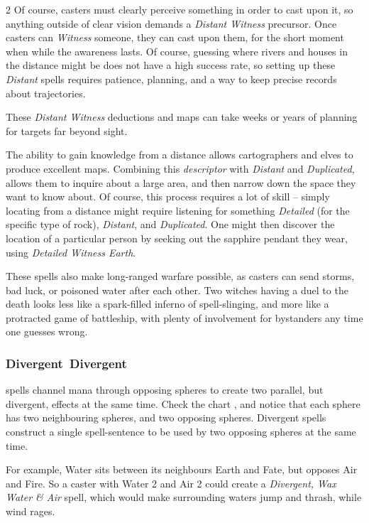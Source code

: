 \begin{multicols}{2}
Of course, casters must clearly perceive something in order to cast upon it, so anything outside of clear vision demands a \textit{Distant Witness} precursor.
Once casters can \textit{Witness} someone, they can cast upon them, for the short moment when while the awareness lasts.
Of course, guessing where rivers and houses in the distance might be does not have a high success rate, so setting up these \textit{Distant} spells requires patience, planning, and a way to keep precise records about trajectories.

These \textit{Distant Witness} deductions and maps can take weeks or years of planning for targets far beyond sight.

\begin{exampletext}
  The ability to gain knowledge from a distance allows \glspl{cartographer} and elves to produce excellent maps.
  Combining this \textit{\gls{descriptor}} with \textit{Distant} and \textit{Duplicated}, allows them to inquire about a large area, and then narrow down the space they want to know about.
  Of course, this process requires a lot of skill -- simply locating  from a distance might require listening for something \textit{Detailed} (for the specific type of rock), \textit{Distant}, and \textit{Duplicated}.
  One might then discover the location of a particular person by seeking out the sapphire pendant they wear, using \textit{Detailed Witness Earth}.

  These spells also make long-ranged warfare possible, as casters can send storms, bad luck, or poisoned water after each other.
  Two witches having a duel to the death looks less like a spark-filled inferno of spell-slinging, and more like a protracted game of battleship, with plenty of involvement for bystanders any time one guesses wrong.
\end{exampletext}

\subsubsection[Divergent]{\gls{Divergent}~Divergent}
spells channel mana through opposing \glspl{sphere} to create two parallel, but divergent, effects at the same time.
Check the chart , and notice that each \gls{sphere} has two neighbouring \glspl{sphere}, and two opposing \glspl{sphere}.
Divergent spells construct a single spell-sentence to be used by two opposing \glspl{sphere} at the same time.

For example, Water sits between its neighbours Earth and Fate, but opposes Air and Fire.
So a caster with Water 2 and Air 2 could create a \textit{Divergent, Wax Water \& Air} spell, which would make surrounding waters jump and thrash, while wind rages.


\end{multicols}
